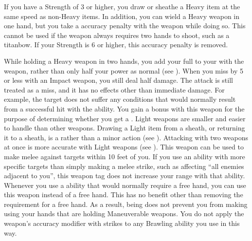     If you have a Strength of 3 or higher, you draw or sheathe a Heavy item at the same speed as non-Heavy items.
    In addition, you can wield a Heavy weapon in one hand, but you take a  accuracy penalty with the weapon while doing so.
    This cannot be used if the weapon always requires two hands to shoot, such as a titanbow.
    If your Strength is 6 or higher, this accuracy penalty is removed.

    While holding a Heavy weapon in two hands, you add your full  to your  with the weapon, rather than only half your power as normal (see ).
     When you miss by 5 or less with an Impact weapon, you still deal half damage.
    The attack is still treated as a miss, and it has no effects other than immediate damage.
    For example, the target does not suffer any conditions that would normally result from a successful hit with the ability.
     You gain a   bonus with this weapon for the purpose of determining whether you get a .
     Light weapons are smaller and easier to handle than other weapons.
    Drawing a Light item from a sheath, or returning it to a sheath, is a  rather than a minor action (see ).
    Attacking with two weapons at once is more accurate with Light weapons (see ).
    \label{Long Weapon} This weapon can be used to make melee  against targets within 10 feet of you.
    If you use an ability with more specific targets than simply making a melee strike, such as affecting ``all enemies adjacent to you'', this weapon tag does not increase your range with that ability.
     Whenever you use a \atBrawling ability that would normally require a free hand, you can use this weapon instead of a free hand.
    This has no benefit other than removing the requirement for a free hand.
    As a result, being \grappled does not prevent you from making  using your hands that are holding Maneuverable weapons.
    You do not apply the weapon's accuracy modifier with strikes to any Brawling ability you use in this way.
